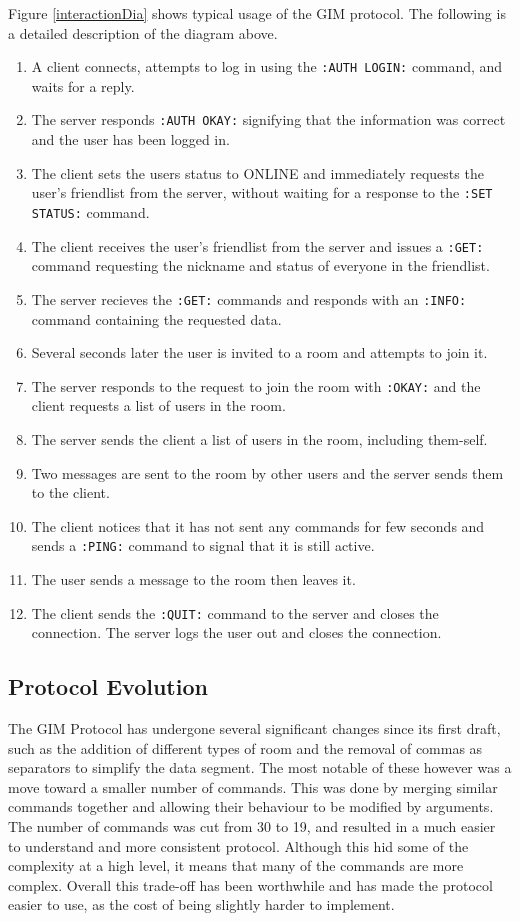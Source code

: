 Figure \ref{interactionDia} shows typical usage of the GIM protocol. The following is a detailed description of the diagram above.
\begin{enumerate}
\item{A client connects, attempts to log in using the \texttt{:AUTH LOGIN:} command, and waits for a reply.}
\item{The server responds \texttt{:AUTH OKAY:} signifying that the information was correct and the user has been logged in.}
\item{The client sets the users status to ONLINE and immediately requests the user's friendlist from the server, without waiting for a response to the \texttt{:SET STATUS:} command.}
\item{The client receives the user's friendlist from the server and issues a \texttt{:GET:} command requesting the nickname and status of everyone in the friendlist.}
\item{The server recieves the \texttt{:GET:} commands and responds with an \texttt{:INFO:} command containing the requested data.}
\item{Several seconds later the user is invited to a room and attempts to join it.}
\item{The server responds to the request to join the room with \texttt{:OKAY:} and the client requests a list of users in the room.}
\item{The server sends the client a list of users in the room, including them-self.}
\item{Two messages are sent to the room by other users and the server sends them to the client.}
\item{The client notices that it has not sent any commands for few seconds and sends a \texttt{:PING:} command to signal that it is still active.}
\item{The user sends a message to the room then leaves it.}
\item{The client sends the \texttt{:QUIT:} command to the server and closes the connection. The server logs the user out and closes the connection.}
\end{enumerate}

\subsection{Protocol Evolution}

The GIM Protocol has undergone several significant changes since its first draft, such as the addition of different types of room and the removal of commas as separators to simplify the data segment. The most notable of these however was a move toward a smaller number of commands. This was done by merging similar commands together and allowing their behaviour to be modified by arguments. The number of commands was cut from 30 to 19, and resulted in a much easier to understand and more consistent protocol. Although this hid some of the complexity at a high level, it means that many of the commands are more complex. Overall this trade-off has been worthwhile and has made the protocol easier to use, as the cost of being slightly harder to implement.

